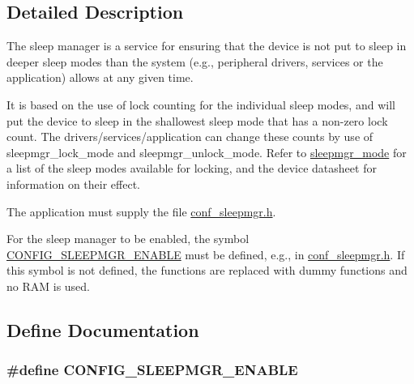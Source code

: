 \subsection{\-Detailed \-Description}
\-The sleep manager is a service for ensuring that the device is not put to sleep in deeper sleep modes than the system (e.\-g., peripheral drivers, services or the application) allows at any given time.

\-It is based on the use of lock counting for the individual sleep modes, and will put the device to sleep in the shallowest sleep mode that has a non-\/zero lock count. \-The drivers/services/application can change these counts by use of sleepmgr\-\_\-lock\-\_\-mode and sleepmgr\-\_\-unlock\-\_\-mode. \-Refer to \hyperlink{group__sleepmgr__group_gaa990bc3ea16fcad09009cdc70dbc38c6}{sleepmgr\-\_\-mode} for a list of the sleep modes available for locking, and the device datasheet for information on their effect.

\-The application must supply the file \hyperlink{conf__sleepmgr_8h}{conf\-\_\-sleepmgr.\-h}.

\-For the sleep manager to be enabled, the symbol \hyperlink{group__sleepmgr__group_gad8e649a9d53092c580960f2f9886ee98}{\-C\-O\-N\-F\-I\-G\-\_\-\-S\-L\-E\-E\-P\-M\-G\-R\-\_\-\-E\-N\-A\-B\-L\-E} must be defined, e.\-g., in \hyperlink{conf__sleepmgr_8h}{conf\-\_\-sleepmgr.\-h}. \-If this symbol is not defined, the functions are replaced with dummy functions and no \-R\-A\-M is used. 

\subsection{\-Define \-Documentation}
\hypertarget{group__sleepmgr__group_gad8e649a9d53092c580960f2f9886ee98}{
\subsubsection[{\-C\-O\-N\-F\-I\-G\-\_\-\-S\-L\-E\-E\-P\-M\-G\-R\-\_\-\-E\-N\-A\-B\-L\-E}]{\setlength{\rightskip}{0pt plus 5cm}\#define \-C\-O\-N\-F\-I\-G\-\_\-\-S\-L\-E\-E\-P\-M\-G\-R\-\_\-\-E\-N\-A\-B\-L\-E}}
\label{group__sleepmgr__group_gad8e649a9d53092c580960f2f9886ee98}


